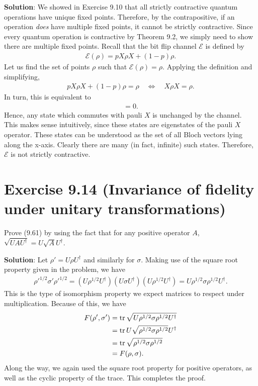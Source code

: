 \documentclass{book}
\newcommand{\mc}[1]{\mathcal{#1}}
\begin{document}
    \textbf{Solution}: We showed in Exercise 9.10 that all strictly contractive quantum operations have unique fixed points. Therefore, by the contrapositive, if an operation \emph{does} have multiple fixed points, it cannot be strictly contractive. Since every quantum operation is contractive by Theorem 9.2, we simply need to show there are multiple fixed points. Recall that the bit flip channel $\mc{E}$ is defined by
    \begin{align}
        \mc{E}(\rho) = p X\rho X + (1-p) \rho.
    \end{align}
    Let us find the set of points $\rho$ such that $\mc{E}(\rho) = \rho$. Applying the definition and simplifying,
    \begin{align}
        p X\rho X +(1-p)\rho = \rho \quad \Leftrightarrow \quad X \rho X = \rho.
    \end{align}
    In turn, this is equivalent to
    \begin{align}
        [\rho, X] = 0.
    \end{align}
    Hence, any state which commutes with pauli $X$ is unchanged by the channel. This makes sense intuitively, since these states are eigenstates of the pauli $X$ operator. These states can be understood as the set of all Bloch vectors lying along the x-axis. Clearly there are many (in fact, infinite) such states. Therefore, $\mc{E}$ is not strictly contractive.
    
\section*{Exercise 9.14 (Invariance of fidelity under unitary transformations)}
    Prove (9.61) by using the fact that for any positive operator $A$, $\sqrt{UAU^\dagger} = U\sqrt{A}U^\dagger$.
    
    \textbf{Solution}: Let $\rho' = U \rho U^\dagger$ and similarly for $\sigma$. Making use of the square root property given in the problem, we have
    \begin{align}
        \rho'^{1/2}\sigma'\rho'^{1/2} = (U\rho^{1/2} U^\dagger) (U \sigma U^\dagger) (U\rho^{1/2}U^\dagger) = U \rho^{1/2}\sigma\rho^{1/2}U^\dagger.
    \end{align}
    This is the type of isomorphism property we expect matrices to respect under multiplication. Because of this, we have
    \begin{align}
    \begin{aligned}
        F(\rho', \sigma') &= \tr\sqrt{U\rho^{1/2}\sigma\rho^{1/2}U^\dagger} \\
        &= \tr U \sqrt{\rho^{1/2}\sigma\rho^{1/2}} U^\dagger \\
        &= \tr \sqrt{\rho^{1/2}\sigma\rho^{1/2}} \\
        &= F(\rho, \sigma).
    \end{aligned}
    \end{align}
    Along the way, we again used the square root property for positive operators, as well as the cyclic property of the trace. This completes the proof.
    
\end{document}
